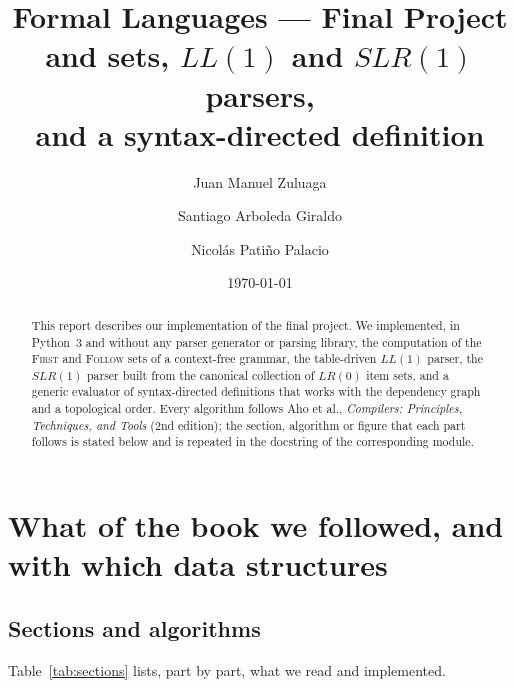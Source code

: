 \documentclass[11pt]{article}
\title{Formal Languages --- Final Project\\[2mm]
\large \first{} and \follow{} sets, $LL(1)$ and $SLR(1)$ parsers,\\
and a syntax-directed definition}
\author{Juan Manuel Zuluaga \and Santiago Arboleda Giraldo \and Nicol\'as Pati\~no Palacio}
\date{\today}
\newcommand{\first}{\textsc{First}}
\newcommand{\follow}{\textsc{Follow}}
\begin{document}
\maketitle

\begin{abstract}
\noindent
This report describes our implementation of the final project. We implemented, in
Python~3 and without any parser generator or parsing library, the computation of the
\first{} and \follow{} sets of a context-free grammar, the table-driven $LL(1)$ parser,
the $SLR(1)$ parser built from the canonical collection of $LR(0)$ item sets, and a
generic evaluator of syntax-directed definitions that works with the dependency graph
and a topological order. Every algorithm follows Aho et al., \emph{Compilers:
Principles, Techniques, and Tools} (2nd edition); the section, algorithm or figure that
each part follows is stated below and is repeated in the docstring of the corresponding
module.
\end{abstract}

\tableofcontents

\section{What of the book we followed, and with which data structures}

\subsection{Sections and algorithms}

Table~\ref{tab:sections} lists, part by part, what we read and implemented.
\end{document}
